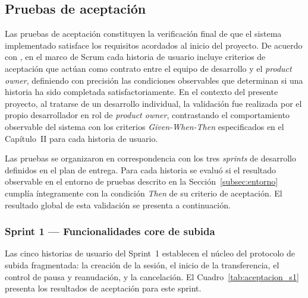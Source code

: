 \subsection{Pruebas de aceptación}
\label{subsec:aceptacion}

Las pruebas de aceptación constituyen la verificación final de que el sistema implementado satisface
los requisitos acordados al inicio del proyecto. De acuerdo con \citet{Cohn2004}, en el marco de
Scrum cada historia de usuario incluye criterios de aceptación que actúan como contrato entre el
equipo de desarrollo y el \textit{product owner}, definiendo con precisión las condiciones
observables que determinan si una historia ha sido completada satisfactoriamente. En el contexto del
presente proyecto, al tratarse de un desarrollo individual, la validación fue realizada por el propio
desarrollador en rol de \textit{product owner}, contrastando el comportamiento observable del sistema
con los criterios \textit{Given-When-Then} especificados en el Capítulo~II para cada historia de
usuario.

Las pruebas se organizaron en correspondencia con los tres \textit{sprints} de desarrollo definidos
en el plan de entrega. Para cada historia se evaluó si el resultado observable en el entorno de
pruebas descrito en la Sección~\ref{subsec:entorno} cumplía íntegramente con la condición
\textit{Then} de su criterio de aceptación. El resultado global de esta validación se presenta a
continuación.

\subsubsection*{Sprint 1 — Funcionalidades core de subida}

Las cinco historias de usuario del Sprint~1 establecen el núcleo del protocolo de subida
fragmentada: la creación de la sesión, el inicio de la transferencia, el control de pausa y
reanudación, y la cancelación. El Cuadro~\ref{tab:aceptacion_s1} presenta los resultados de
aceptación para este sprint.


